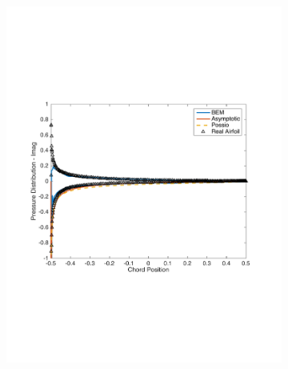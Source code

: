\documentclass{article}
\begin{document}
\begin{figure}[h]
\begin{subfigure}{0.3\textwidth}
	\includegraphics[width = \textwidth, height=0.16\textheight]{NACA1101_pressure_k10imag}
\end{subfigure}%
\begin{subfigure}{0.33\textwidth}
	\centering

\end{subfigure}
\end{figure}
\end{document}
